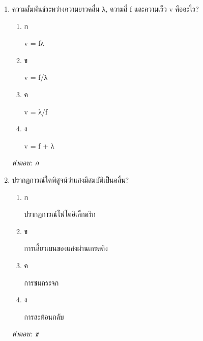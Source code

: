 \documentclass[12pt]{article}
\begin{document}
\begin{enumerate}[label=\arabic*., itemsep=0.5\baselineskip, topsep=0.5\baselineskip, leftmargin=*]
\item ความสัมพันธ์ระหว่างความยาวคลื่น λ, ความถี่ f และความเร็ว v คืออะไร?
\begin{enumerate}[label=\alph*)., itemsep=0.3\baselineskip, topsep=0.3\baselineskip]
\item ก\ 
\begin{minipage}[t]{0.9\linewidth}
\raggedright v = fλ
\end{minipage}
\item ข\ 
\begin{minipage}[t]{0.9\linewidth}
\raggedright v = f/λ
\end{minipage}
\item ค\ 
\begin{minipage}[t]{0.9\linewidth}
\raggedright v = λ/f
\end{minipage}
\item ง\ 
\begin{minipage}[t]{0.9\linewidth}
\raggedright v = f + λ
\end{minipage}
\end{enumerate}
\vspace{-0.3\baselineskip}
\begin{small}
\textit{คำตอบ: ก}
\end{small}

\item ปรากฏการณ์ใดพิสูจน์ว่าแสงมีสมบัติเป็นคลื่น?
\begin{enumerate}[label=\alph*)., itemsep=0.3\baselineskip, topsep=0.3\baselineskip]
\item ก\ 
\begin{minipage}[t]{0.9\linewidth}
\raggedright ปรากฏการณ์โฟโตอิเล็กตริก
\end{minipage}
\item ข\ 
\begin{minipage}[t]{0.9\linewidth}
\raggedright การเลี้ยวเบนของแสงผ่านเกรตติง
\end{minipage}
\item ค\ 
\begin{minipage}[t]{0.9\linewidth}
\raggedright การชนกระจก
\end{minipage}
\item ง\ 
\begin{minipage}[t]{0.9\linewidth}
\raggedright การสะท้อนกลับ
\end{minipage}
\end{enumerate}
\vspace{-0.3\baselineskip}
\begin{small}
\textit{คำตอบ: ข}
\end{small}


\end{enumerate}
\end{document}
